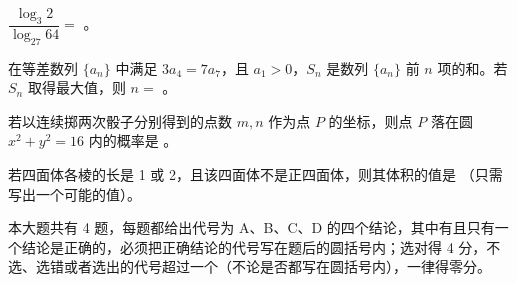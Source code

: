 \begin{question}
$\dfrac{\log_3 2}{\log_{27}64}=$ \gkblank{}。

\end{question}
\begin{question}
在等差数列 $\{a_n\}$ 中满足 $3a_4=7a_7$，且 $a_1>0$，$S_n$ 是数列 $\{a_n\}$ 前 $n$ 项的和。若 $S_n$ 取得最大值，则 $n=$ \gkblank{}。

\end{question}
\begin{question}
若以连续掷两次骰子分别得到的点数 $m,n$ 作为点 $P$ 的坐标，则点 $P$ 落在圆 $x^2+y^2=16$ 内的概率是 \gkblank{}。

\end{question}
\begin{question}
若四面体各棱的长是 1 或 2，且该四面体不是正四面体，则其体积的值是 \gkblank{}（只需写出一个可能的值）。

\end{question}

本大题共有 4 题，每题都给出代号为 A、B、C、D 的四个结论，其中有且只有一个结论是正确的，必须把正确结论的代号写在题后的圆括号内；选对得 4 分，不选、选错或者选出的代号超过一个（不论是否都写在圆括号内），一律得零分。

